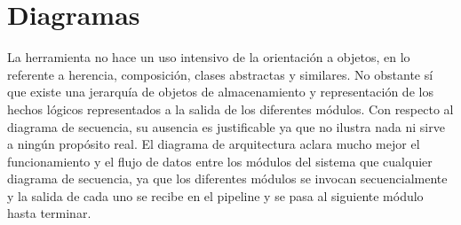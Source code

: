 \newpage
\chapter{Diagramas}
La herramienta no hace un uso intensivo de la orientación a objetos, en lo referente a herencia, composición, clases abstractas y similares. No obstante sí que existe una jerarquía de objetos de almacenamiento y representación de los hechos lógicos representados a la salida de los diferentes módulos. Con respecto al diagrama de secuencia, su ausencia es justificable ya que no ilustra nada ni sirve a ningún propósito real. El diagrama de arquitectura aclara mucho mejor el funcionamiento y el flujo de datos entre los módulos del sistema que cualquier diagrama de secuencia, ya que los diferentes módulos se invocan secuencialmente y la salida de cada uno se recibe en el pipeline y se pasa al siguiente módulo hasta terminar.

